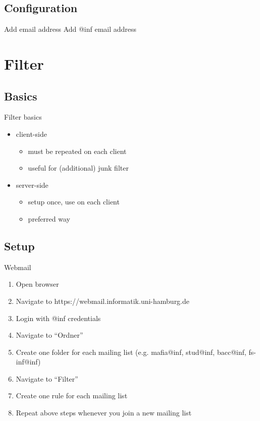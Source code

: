 \documentclass{beamer}
\begin{document}
	\subsection{Configuration}
	\begin{frame}{Add email address}
		Add @inf email address
	\end{frame}
	
	\section{Filter}
	\subsection{Basics}
	\begin{frame}{Filter basics}
		\begin{itemize}
			\item client-side
			\begin{itemize}
				\item must be repeated on each client
				\item useful for (additional) junk filter
			\end{itemize}
			\item server-side
			\begin{itemize}
				\item setup once, use on each client
				\item preferred way
			\end{itemize}
		\end{itemize}
	\end{frame}
	
	\subsection{Setup}
	\begin{frame}{Webmail}
		\begin{enumerate}
			\item Open browser
			\item Navigate to https://webmail.informatik.uni-hamburg.de
			\item Login with @inf credentials
			\item Navigate to ``Ordner''
			\item Create one folder for each mailing list (e.g. mafia@inf, stud@inf, bacc@inf, fs-inf@inf)
			\item Navigate to ``Filter''
			\item Create one rule for each mailing list
			\item Repeat above steps whenever you join a new mailing list
		\end{enumerate}
	\end{frame}
	
\end{document}
